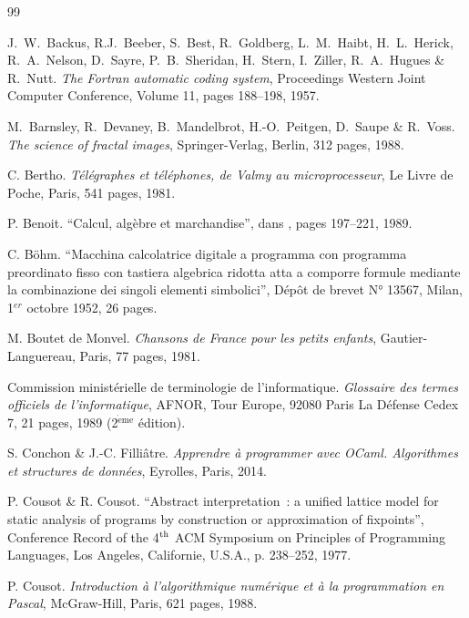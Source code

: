 \begin{thebibliography}{99}

\vfill

 J.~W.~Backus, R.J.~Beeber, S.~Best, R.~Goldberg, 
L.~M.~Haibt, H.~L.~Herick, R.~A.~Nelson, D.~Sayre, P.~B.~Sheridan, H.~Stern,
I.~Ziller, R.~A.~Hugues \& R.~Nutt.
{\em The Fortran automatic coding system}, 
Proceedings Western Joint Computer Conference, Volume 11, 
pages 188--198, 1957.

 M.~Barnsley, R.~Devaney, B.~Mandelbrot,
H.-O.~Peitgen, D.~Saupe \& R.~Voss.
{\em The science of fractal images}, Springer-Verlag, Berlin, 312 pages, 1988.

 C. Bertho.
{\em Télégraphes et téléphones, de Valmy au microprocesseur}, 
Le Livre de Poche, Paris, 541 pages, 1981.

 P. Benoit.
``Calcul, algèbre et marchandise'', \rm dans \cite{serres1}, pages 197--221, 1989.

 C. Böhm.
``Macchina calcolatrice digitale a programma con programma preordinato fisso con
tastiera algebrica ridotta atta a comporre formule mediante la
combinazione dei singoli elementi simbolici'', Dépôt de brevet N° 13567, Milan,
1$^{er}$ octobre 1952, 26 pages.

 M. Boutet de Monvel.
{\em Chansons de France pour les petits enfants}, 
Gautier-Languereau, Paris, 77 pages, 1981.

\thispagestyle{empty}

 Commission ministérielle de terminologie de l'informatique.
{\em Glossaire des termes officiels de l'informatique}, AFNOR, Tour Europe, 92080 Paris
La Défense Cedex 7, 21 pages, 1989 (2$^{\mathrm{\grave{e}me}}$ édition).

 S. Conchon \& J.-C. Filliâtre.
{\em Apprendre à programmer avec OCaml. Algorithmes et structures de données}, 
Eyrolles, Paris, 2014.

 P. Cousot \& R. Cousot.
``Abstract interpretation~: a unified lattice model for static analysis
of programs by construction or approximation of fixpoints'', Conference
Record of the 4$^{\rm th}$ ACM Symposium on Principles of Programming
Languages, Los Angeles, Californie, U.S.A., p. 238--252, 1977.

 P. Cousot.
{\em Introduction à l'algorithmique numérique et à la 
programmation en Pascal}, McGraw-Hill, Paris, 621 pages, 1988.


\end{thebibliography}
